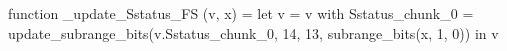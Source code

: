 function _update_Sstatus_FS (v, x) = let v = { v with Sstatus_chunk_0 = update_subrange_bits(v.Sstatus_chunk_0, 14, 13, subrange_bits(x, 1, 0)) } in
  v
